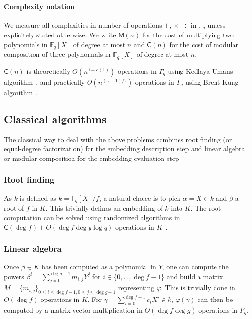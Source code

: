 \documentclass[12pt]{article}
\theoremstyle{plain}
\theoremstyle{definition}
\def\F{\ensuremath{\mathbb{F}}}
\def\MM{\ensuremath{\mathsf{M}}}
\def\MC{\ensuremath{\mathsf{C}}}
\newcounter{algorithm}
\begin{document}
\paragraph{Complexity notation} We measure all complexities in number
of operations $+$, $\times$, $\div$ in $\F_q$ unless explicitely
stated otherwise. We write $\MM(n)$ for
the cost of multiplying two polynomials in $\F_q[X]$ of degree at most
$n$ and $\MC(n)$ for the cost of modular composition of three
polynomials in $\F_q[X]$ of degree at most $n$.

$\MC(n)$ is theoretically $O(n^{1 + o(1)})$ operations in $F_q$
using Kedlaya-Umans algorithm~\cite{kedlaya+umans08},
and practically
$O(n^{(\omega + 1)/2})$ operations in $F_q$
using Brent-Kung algorithm~\cite{brent+kung}.

\subsection{Classical algorithms}

The classical way to deal with the above problems combines
root finding (or equal-degree factorization)
for the embedding description step
and linear algebra or modular composition
for the embedding evaluation step.

\subsubsection{Root finding}

As $k$ is defined as $k=\F_q[X]/f$, a natural choice is to
pick $\alpha = X\in k$
and $\beta$ a root of $f$ in $K$.
This trivially defines an embedding of $k$ into $K$.
The root computation can be solved using randomized algorithms
in~$\MC(\deg f) + O(\deg f \deg g \log q)$ operations
in $K$~\cite{von1992computing,KeUm11}.

\subsubsection{Linear algebra}

Once $\beta \in K$ has been computed as a polynomial in $Y$,
one can compute the powers
$\beta^i = \sum_{j=0}^{\deg g-1} m_{i,j} Y^j$
for $i \in \{0, \ldots, \deg f-1\}$ and build a matrix
$M = \{m_{i, j}\}_{0\leq i \leq \deg f-1, 0 \leq j \leq \deg g -1}$
representing $\varphi$.
This is trivially done in $O(\deg f)$ operations in $K$.
For $\gamma = \sum_{i = 0}^{\deg f -1} c_i X^i \in k$,
$\varphi(\gamma)$ can then be computed by a
matrix-vector multiplication in $O(\deg f \deg g)$ operations in $F_q$.
\end{document}
